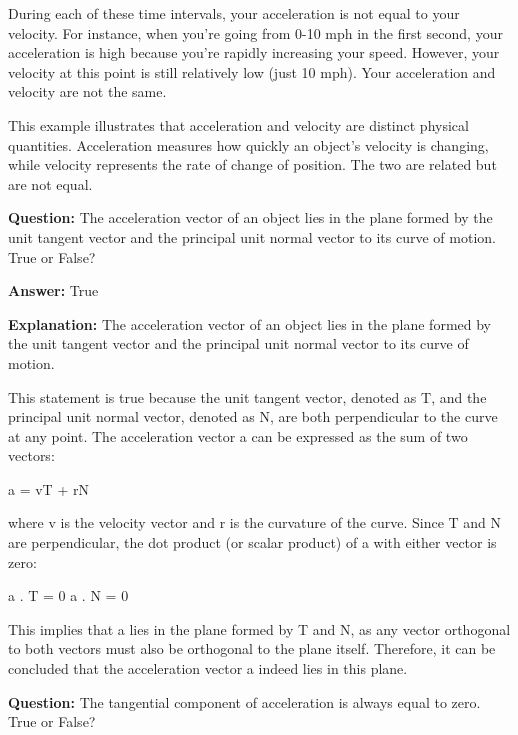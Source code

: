 \documentclass{article}
\begin{document}
During each of these time intervals, your acceleration is not equal to your velocity. For instance, when you're going from 0-10 mph in the first second, your acceleration is high because you're rapidly increasing your speed. However, your velocity at this point is still relatively low (just 10 mph). Your acceleration and velocity are not the same.

This example illustrates that acceleration and velocity are distinct physical quantities. Acceleration measures how quickly an object's velocity is changing, while velocity represents the rate of change of position. The two are related but are not equal.
                
                \vspace{0.5cm} 
        
            
                \textbf {Question:} The acceleration vector of an object lies in the plane formed by the unit tangent vector and the principal unit normal vector to its curve of motion. True or False?
                
                \textbf{Answer:} True

                \textbf{Explanation:} The acceleration vector of an object lies in the plane formed by the unit tangent vector and the principal unit normal vector to its curve of motion.

This statement is true because the unit tangent vector, denoted as T, and the principal unit normal vector, denoted as N, are both perpendicular to the curve at any point. The acceleration vector a can be expressed as the sum of two vectors: 

a = vT + rN

where v is the velocity vector and r is the curvature of the curve. Since T and N are perpendicular, the dot product (or scalar product) of a with either vector is zero:

a . T = 0
a . N = 0

This implies that a lies in the plane formed by T and N, as any vector orthogonal to both vectors must also be orthogonal to the plane itself. Therefore, it can be concluded that the acceleration vector a indeed lies in this plane.
                
                \vspace{0.5cm} 
        
            
                \textbf {Question:} The tangential component of acceleration is always equal to zero. True or False?
                
\end{document}
